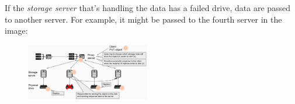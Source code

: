 \begin{eg}
    \noindent
    If the \emph{storage server} that's handling the data has a failed drive,
    data are passed to another server. For example, it might be passed to the
    fourth server in the image:

    \begin{figure}[h!]
        \centering
        \includegraphics[width=0.48\textwidth]{images/oss-put-6.png}
    \end{figure}
\end{eg}